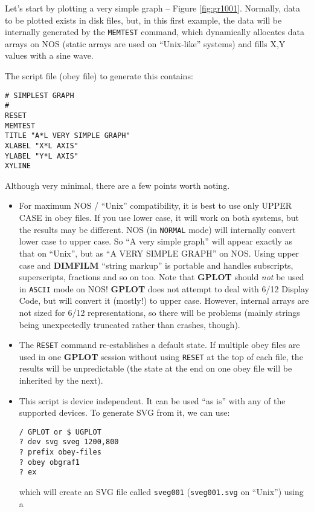 \documentclass[a4paper,twoside,11pt]{article}
\newcommand{\newpara}{\par\vspace{4mm}\noindent}
\begin{document}
Let's start by plotting a very simple graph -- Figure \ref{fig:gr1001}.
Normally, data to be
plotted exists in disk files, but, in this first example, the data
will be internally generated by the \texttt{MEMTEST} command, which dynamically
allocates data arrays on NOS (static arrays are used on ``Unix-like'' systems)
and fills X,Y values with a sine wave.

\newpara
The script file (obey file) to generate this contains:
\begin{lstlisting}
# SIMPLEST GRAPH
#
RESET
MEMTEST
TITLE "A*L VERY SIMPLE GRAPH"
XLABEL "X*L AXIS"
YLABEL "Y*L AXIS"
XYLINE
\end{lstlisting}

\newpara
Although very minimal, there are a few points worth noting.

\begin{itemize}
\item For maximum NOS / ``Unix'' compatibility, it is best to use only UPPER CASE in obey files.
If you use lower case, it will work on both systems, but the results may be different. 
NOS (in \texttt{NORMAL} mode) will internally convert lower case to upper case. 
So ``A very simple graph'' will appear exactly as that on ``Unix'', but as ``A VERY SIMPLE GRAPH'' on NOS. 
Using upper case and \textbf{DIMFILM} ``string markup'' is portable and handles subscripts, superscripts, 
fractions and so on too. Note that \textbf{GPLOT} should \emph{not} be used in \texttt{ASCII} mode on NOS! 
\textbf{GPLOT} does not attempt to deal with 6/12 Display Code, but will convert it (mostly!) to upper case. 
However, internal arrays are not sized for 6/12 representations, so there will be problems 
(mainly strings being unexpectedly truncated rather than crashes, though).
\item The \texttt{RESET} command re-establishes a default state. If multiple obey files are used in one \textbf{GPLOT} session
without using \texttt{RESET} at the top of each file, the results will be unpredictable (the state 
at the end on one obey file will be inherited by the next).
\item This script is device independent. It can be used ``as is'' with any of the supported devices.
To generate SVG from it, we can use:
\begin{lstlisting}
/ GPLOT or $ UGPLOT
? dev svg sveg 1200,800
? prefix obey-files
? obey obgraf1
? ex
\end{lstlisting}
which will create an SVG file called \texttt{sveg001} (\texttt{sveg001.svg} on ``Unix'') using a 

\end{itemize}
\end{document}
